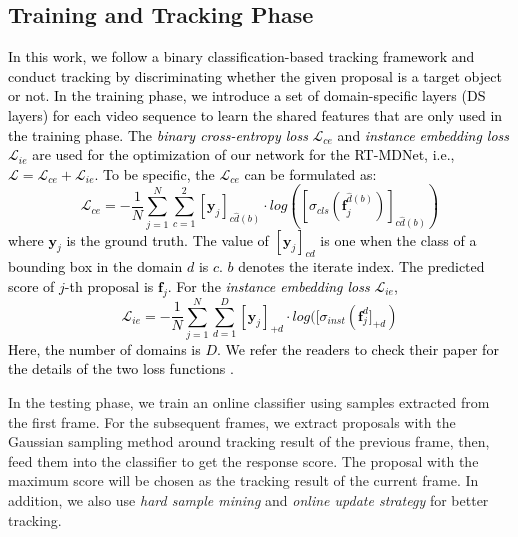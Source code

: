 \documentclass[journal]{IEEEtran}
\begin{document}
\subsection{Training and Tracking Phase}  \label{lossfunctions}
\textcolor{black}{
In this work, we follow a binary classification-based tracking framework \cite{Jung_2018_ECCV} and conduct tracking by discriminating whether the given proposal is a target object or not. In the training phase, we introduce a set of domain-specific layers (DS layers) for each video sequence to learn the shared features that are only used in the training phase. The \emph{binary cross-entropy loss} $\mathcal{L}_{ce}$ and \emph{instance embedding loss} $\mathcal{L}_{ie}$ are used for the optimization of our network for the RT-MDNet, i.e., $\mathcal{L} = \mathcal{L}_{ce} + \mathcal{L}_{ie}$. 
To be specific, the $\mathcal{L}_{ce}$ can be formulated as: 
\begin{equation} 
\label{LclsFunction}
\mathcal{L}_{ce} = -\frac{1}{N} \sum_{j=1}^{N}\sum_{c=1}^{2} [\textbf{y}_j]_{c\hat{d}(b)} \cdot log([\sigma_{cls} (\textbf{f}_j^{\hat{d}(b)})]_{c\hat{d}(b)})  
\end{equation} 
where $\textbf{y}_j$ is the ground truth. The value of $[\textbf{y}_j]_{cd}$ is one when the class of a bounding box in the domain $d$ is $c$. $b$ denotes the iterate index. The predicted score of $j$-th proposal is $\textbf{f}_j$. 
For the \emph{instance embedding loss} $\mathcal{L}_{ie}$, 
\begin{equation}
\label{LinstFunction}
\mathcal{L}_{ie} = -\frac{1}{N} \sum_{j=1}^{N}\sum_{d=1}^{D} [\textbf{y}_j]_{+d} \cdot log([\sigma_{inst} (\textbf{f}_j^{d}]_{+d}) 
\end{equation}
Here, the number of domains is $D$. We refer the readers to check their paper for the details of the two loss functions \cite{Jung_2018_ECCV}. 
} 


 

In the testing phase, we train an online classifier using samples extracted from the first frame. For the subsequent frames, we extract proposals with the Gaussian sampling method around tracking result of the previous frame, then,  feed them into the classifier to get the response score. The proposal with the maximum score will be chosen as the tracking result of the current frame. In addition, we also use \emph{hard sample mining} and \emph{online update strategy} for better tracking. 
\end{document}
